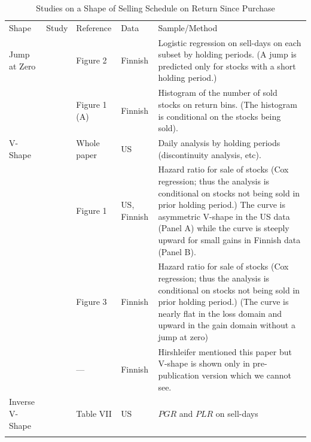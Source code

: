 \documentclass[11pt, a4paper]{article}
\begin{document}
\begin{appendices}
\begin{table}[H]
	\caption{Studies on a Shape of Selling Schedule on Return Since Purchase}
	\footnotesize
	\centering
	\begin{tabular}{>{\raggedright\arraybackslash}p{1.5cm} 
			>{\raggedright\arraybackslash}p{2.5cm} 
			>{\raggedright\arraybackslash}p{2.5cm} 
			>{\raggedright\arraybackslash}p{1.5cm} 
			>{\raggedright\arraybackslash}p{6cm}}
		\hline
		\addlinespace[0.1cm]
		Shape & Study & Reference & Data & Sample/Method \\ 
		\addlinespace[0.1cm]
		\hline
		\addlinespace[0.1cm]
		Jump at Zero & \citet{Kaustia10} & Figure 2 & Finnish & Logistic regression on sell-days on each subset by holding periods. (A jump is predicted only for stocks with a short holding period.)\\
		\addlinespace[0.3cm]
		             & \citet{GrinblattKeloharju01} & Figure 1 (A) & Finnish & Histogram of the number of sold stocks on return bins. (The histogram is conditional on the stocks being sold).\\
		\addlinespace[0.1cm]
		\hline
		\addlinespace[0.1cm]
		 V-Shape &  \citet{BenDavidHirshleifer12} & Whole paper & US  & Daily analysis by holding periods (discontinuity analysis, etc).  \\
		 \addlinespace[0.3cm]
		         & \citet{BarberOdean13} & Figure 1 & US, Finnish & Hazard ratio for sale of stocks (Cox regression; thus the analysis is conditional on stocks not being sold in prior holding period.) The curve is asymmetric V-shape in the US data (Panel A) while the curve is steeply upward for small gains in Finnish data (Panel B).\\
		 \addlinespace[0.3cm]
		          & \citet{SeruShumwayStoffman09} & Figure 3 & Finnish & Hazard ratio for sale of stocks (Cox regression; thus the analysis is conditional on stocks not being sold in prior holding period.) (The curve is nearly flat in the loss domain and upward in the gain domain without a jump at zero)\\
		 \addlinespace[0.3cm]
		          & \citet{GrinblattKeloharjuLinnainmaa12} & --- & Finnish & Hirshleifer mentioned this paper but V-shape is shown only in pre-publication version which we cannot see.\\
		 \addlinespace[0.1cm]
		 \hline      
		 \addlinespace[0.1cm]
		 Inverse V-Shape & \citet{Odean98} & Table VII & US & $PGR$ and $PLR$ on sell-days\\
		 \addlinespace[0.1cm]
		\hline
		\label{table:studies}
	\end{tabular}
\end{table}



\end{appendices}
\end{document}
